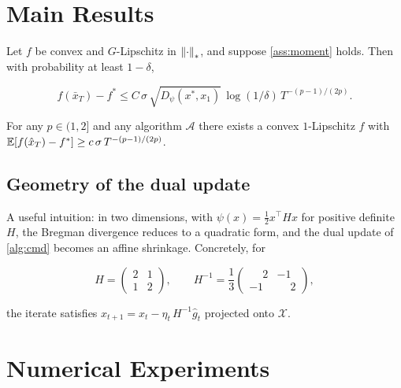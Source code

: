 \section{Main Results}\label{sec:main}

\begin{theorem}\label{thm:upper}
Let $f$ be convex and $G$-Lipschitz in $\left\lVert\cdot\right\rVert_{*}$, and suppose \cref{ass:moment} holds. Then with probability at least $1 - \delta$,

\begin{equation}\label{eq:upper}f(\bar{x}_{T}) - f^{*} \leq C \, \sigma \, \sqrt{D_{\psi}(x^{*}, x_{1})}\, \log(1/\delta) \, T^{-(p-1)/(2p)}.\end{equation}
\end{theorem}

\begin{theorem}\label{thm:lower}
For any $p \in (1, 2]$ and any algorithm $\mathcal{A}$ there exists a convex $1$-Lipschitz $f$ with $\mathbb{E}[ f(\hat{x}_{T}) - f^{*} ] \geq c \, \sigma \, T^{-(p-1)/(2p)}$.
\end{theorem}

\subsection{Geometry of the dual update}\label{sec:geometry}

A useful intuition: in two dimensions, with $\psi(x) = \tfrac{1}{2}x^{\top} H x$ for positive definite $H$, the Bregman divergence reduces to a quadratic form, and the dual update of \cref{alg:cmd} becomes an affine shrinkage. Concretely, for

\begin{equation*}H = \begin{pmatrix}2 & 1 \\ 1 & 2\end{pmatrix}, \qquad H^{-1}= \frac{1}{3}\begin{pmatrix}\phantom{-}2 & -1 \\ -1 & \phantom{-}2\end{pmatrix},\end{equation*}

the iterate satisfies $x_{t+1}= x_{t} - \eta_{t} \, H^{-1}\hat g_{t}$ projected onto $\mathcal{X}$.

\section{Numerical Experiments}\label{sec:exp}

